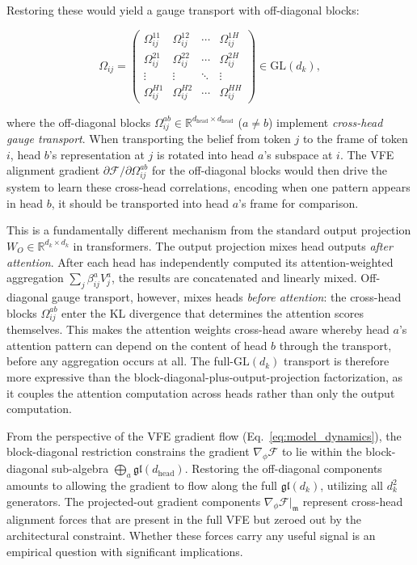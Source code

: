 \documentclass[twoside,11pt]{article}
\begin{document}
Restoring these would yield a gauge transport with off-diagonal blocks:

\begin{equation}
\Omega_{ij} = \begin{pmatrix}
\Omega_{ij}^{11} & \Omega_{ij}^{12} & \cdots & \Omega_{ij}^{1H} \\
\Omega_{ij}^{21} & \Omega_{ij}^{22} & \cdots & \Omega_{ij}^{2H} \\
\vdots & \vdots & \ddots & \vdots \\
\Omega_{ij}^{H1} & \Omega_{ij}^{H2} & \cdots & \Omega_{ij}^{HH}
\end{pmatrix} \in \mathrm{GL}(d_k),
\label{eq:full_gauge_transport}
\end{equation}

where the off-diagonal blocks $\Omega_{ij}^{ab} \in \mathbb{R}^{d_{\text{head}} \times d_{\text{head}}}$ ($a \neq b$) implement \emph{cross-head gauge transport}. When transporting the belief from token $j$ to the frame of token $i$, head $b$'s representation at $j$ is rotated into head $a$'s subspace at $i$. The VFE alignment gradient $\partial \mathcal{F}/\partial \Omega_{ij}^{ab}$ for the off-diagonal blocks would then drive the system to learn these cross-head correlations, encoding when one pattern appears in head $b$, it should be transported into head $a$'s frame for comparison.

This is a fundamentally different mechanism from the standard output projection $W_O \in \mathbb{R}^{d_k \times d_k}$ in transformers. The output projection mixes head outputs \emph{after attention}. After each head has independently computed its attention-weighted aggregation $\sum_j \beta_{ij}^a V_j^a$, the results are concatenated and linearly mixed. Off-diagonal gauge transport, however, mixes heads \emph{before attention}: the cross-head blocks $\Omega_{ij}^{ab}$ enter the KL divergence that determines the attention scores themselves. This makes the attention weights cross-head aware whereby head $a$'s attention pattern can depend on the content of head $b$ through the transport, before any aggregation occurs at all. The full-$\mathrm{GL}(d_k)$ transport is therefore more expressive than the block-diagonal-plus-output-projection factorization, as it couples the attention computation across heads rather than only the output computation.

From the perspective of the VFE gradient flow (Eq.~\ref{eq:model_dynamics}), the block-diagonal restriction constrains the gradient $\nabla_\phi \mathcal{F}$ to lie within the block-diagonal sub-algebra $\bigoplus_a \mathfrak{gl}(d_{\text{head}})$. Restoring the off-diagonal components amounts to allowing the gradient to flow along the full $\mathfrak{gl}(d_k)$, utilizing all $d_k^2$ generators. The projected-out gradient components $\nabla_\phi \mathcal{F}\big|_{\mathfrak{m}}$ represent cross-head alignment forces that are present in the full VFE but zeroed out by the architectural constraint. Whether these forces carry any useful signal is an empirical question with significant implications.
\end{document}

